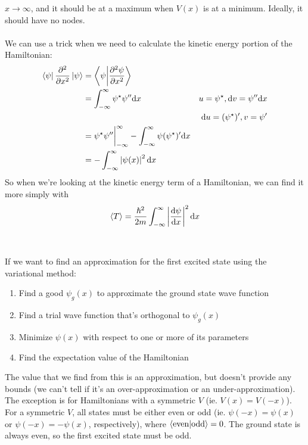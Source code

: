 \documentclass[a4paper]{article}
\begin{document}
$x \to \infty$, and it should be at a maximum when $V(x)$ is at a minimum.
Ideally, it should have no nodes.
\\~\\
We can use a trick when we need to calculate the kinetic energy portion of
the Hamiltonian:
\begin{align*}
	\brak{\psi}\pd[2]{x}\bket{\psi} &= \braket{\psi}{\pder{^2\psi}{x^2}}\\
	&= \int_{-\infty}^{\infty} \psi^\star\psi''\d x
	& u = \psi^\star,\d v=\psi''\d x\\
	&& \d u = (\psi^\star)', v = \psi'\\
	&= \psi^\star\psi''\bigg|_{-\infty}^\infty -
	\int_{-\infty}^{\infty} \psi(\psi^\star)'\d x\\
	&= -\int_{-\infty}^\infty \abs{\psi(x)}^2\d x
\end{align*}
So when we're looking at the kinetic energy term of a Hamiltonian, we can find
it more simply with
\[
\left\langle T\right\rangle = \frac{\hslash^2}{2m}\int_{-\infty}^\infty\left\lvert \frac{\mathrm{d} \psi}{\mathrm{d} x}\right\rvert^2\mathrm{d} x
\]
\\~\\
If we want to find an approximation for the first excited state using the
variational method:
\begin{enumerate}
	\item Find a good $\psi_g(x)$ to approximate the ground state
		wave function
	\item Find a trial wave function that's orthogonal to $\psi_g(x)$
	\item Minimize $\psi(x)$ with respect to one or more of its parameters
	\item Find the expectation value of the Hamiltonian
\end{enumerate}
The value that we find from this is an approximation, but doesn't provide any
bounds (we can't tell if it's an over-approximation or an under-approximation).
The exception is for Hamiltonians with a symmetric $V$ (ie. $V(x) = V(-x)$).
For a symmetric $V$, all states must be either even or odd
(ie. $\psi(-x) = \psi(x)$ or $\psi(-x) = -\psi(x)$, respectively), where
$\left\langle \text{even}\middle\vert \text{odd} \right\rangle = 0$. The ground state is always even, so the
first excited state must be odd.
\\~\\
\end{document}
